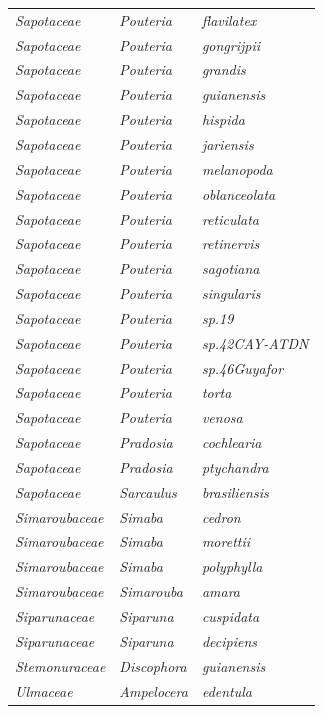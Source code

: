 \documentclass[fleqn,10pt]{ArtEcoFoG} %
\begin{document}
\begin{table}[t]
\begin{tabular}{lll}
\em{Sapotaceae} & \em{Pouteria} & \em{flavilatex}\\
\addlinespace
\em{Sapotaceae} & \em{Pouteria} & \em{gongrijpii}\\
\em{Sapotaceae} & \em{Pouteria} & \em{grandis}\\
\em{Sapotaceae} & \em{Pouteria} & \em{guianensis}\\
\em{Sapotaceae} & \em{Pouteria} & \em{hispida}\\
\em{Sapotaceae} & \em{Pouteria} & \em{jariensis}\\
\addlinespace
\em{Sapotaceae} & \em{Pouteria} & \em{melanopoda}\\
\em{Sapotaceae} & \em{Pouteria} & \em{oblanceolata}\\
\em{Sapotaceae} & \em{Pouteria} & \em{reticulata}\\
\em{Sapotaceae} & \em{Pouteria} & \em{retinervis}\\
\em{Sapotaceae} & \em{Pouteria} & \em{sagotiana}\\
\addlinespace
\em{Sapotaceae} & \em{Pouteria} & \em{singularis}\\
\em{Sapotaceae} & \em{Pouteria} & \em{sp.19}\\
\em{Sapotaceae} & \em{Pouteria} & \em{sp.42CAY-ATDN}\\
\em{Sapotaceae} & \em{Pouteria} & \em{sp.46Guyafor}\\
\em{Sapotaceae} & \em{Pouteria} & \em{torta}\\
\addlinespace
\em{Sapotaceae} & \em{Pouteria} & \em{venosa}\\
\em{Sapotaceae} & \em{Pradosia} & \em{cochlearia}\\
\em{Sapotaceae} & \em{Pradosia} & \em{ptychandra}\\
\em{Sapotaceae} & \em{Sarcaulus} & \em{brasiliensis}\\
\em{Simaroubaceae} & \em{Simaba} & \em{cedron}\\
\addlinespace
\em{Simaroubaceae} & \em{Simaba} & \em{morettii}\\
\em{Simaroubaceae} & \em{Simaba} & \em{polyphylla}\\
\em{Simaroubaceae} & \em{Simarouba} & \em{amara}\\
\em{Siparunaceae} & \em{Siparuna} & \em{cuspidata}\\
\em{Siparunaceae} & \em{Siparuna} & \em{decipiens}\\
\addlinespace
\em{Stemonuraceae} & \em{Discophora} & \em{guianensis}\\
\em{Ulmaceae} & \em{Ampelocera} & \em{edentula}\\

\end{tabular}
\end{table}
\end{document}
